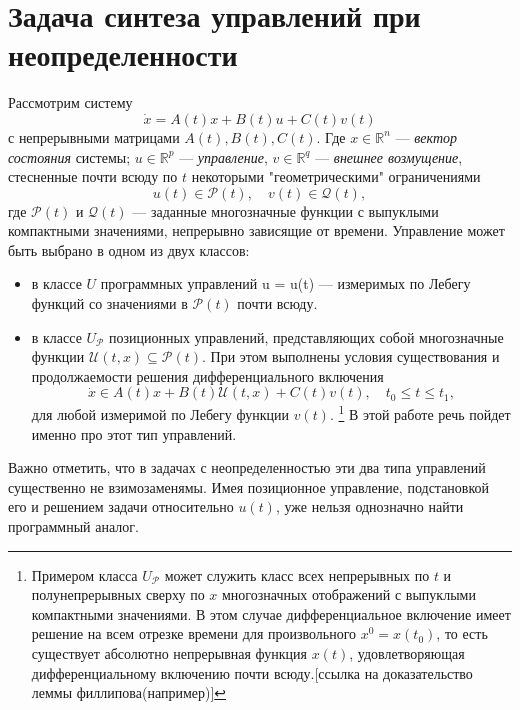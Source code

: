 \section{Задача синтеза управлений при неопределенности}

Рассмотрим систему
\begin{equation}\label{problem}
    \dot{x} = A(t)x + B(t)u + C(t)v(t)
\end{equation}
с непрерывными матрицами \( A(t), B(t), C(t) \). Где \( x \in \mathbb{R}^n \)
 --- \emph{вектор состояния} системы; \( u \in \mathbb{R}^p \) --- 
 \emph{управление}, \( v \in \mathbb{R}^q \) --- \emph{внешнее возмущение},
 стесненные почти всюду по \( t \) некоторыми "геометрическими" ограничениями
\[
    u(t) \in \mathcal{P}(t), \quad v(t) \in \mathcal{Q}(t),
\]
 где \( \mathcal{P}(t) \) и \( \mathcal{Q}(t) \) --- заданные многозначные
 функции с выпуклыми компактными значениями, непрерывно зависящие от времени. 
Управление может быть выбрано в одном из двух классов:
\begin{itemize}
    \item в классе \( U \) программных управлений u = u(t) --- измеримых по
     Лебегу функций со значениями в \( \mathcal{P}(t) \) почти всюду.
    \item в классе \( U_\mathcal{P} \) позиционных управлений, представляющих
     собой многозначные функции \( \mathcal{U}(t,x) \subseteq
     \mathcal{P}(t) \). При этом выполнены условия существования и
     продолжаемости решения дифференциального включения
    \begin{equation}\label{dif_inclusion}
        \dot{x} \in A(t)x + B(t)\mathcal{U}(t,x) + C(t)v(t), \quad
         t_0 \le t \le t_1, 
    \end{equation}
    для любой измеримой по Лебегу функции \( v(t) \). \footnote{Примером класса
     \( U_\mathcal{P} \) может служить класс всех непрерывных по \( t \) и
     полунепрерывных сверху по \( x \) многозначных отображений с выпуклыми
     компактными значениями. В этом случае дифференциальное включение имеет
     решение на всем отрезке времени для произвольного \( x^0 = x(t_0) \),
     то есть существует абсолютно непрерывная функция \( x(t) \),
     удовлетворяющая дифференциальному включению почти всюду.[ссылка на
     доказательство леммы филлипова(например)]} В этой работе речь пойдет 
     именно про этот тип управлений.
\end{itemize}
Важно отметить, что в задачах с неопределенностью эти два типа управлений
 существенно не взимозаменямы. Имея позиционное управление, подстановкой его
 и решением задачи относительно \( u(t) \), уже нельзя однозначно найти
 программный аналог.

